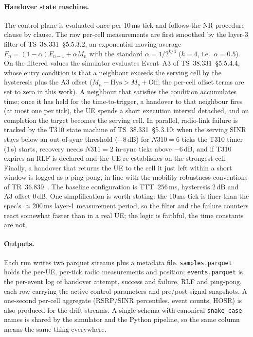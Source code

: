 \paragraph{Handover state machine.}
The control plane is evaluated once per 10\,ms tick and follows the NR procedure
clause by clause. The raw per-cell measurements are first smoothed by the
layer-3 filter of TS~38.331~\S5.5.3.2, an exponential moving average
$F_n = (1-\alpha)F_{n-1} + \alpha M_n$ with the standard
$\alpha = 1/2^{k/4}$ ($k=4$, i.e.\ $\alpha = 0.5$). On the filtered values the
simulator evaluates Event~A3 of TS~38.331~\S5.5.4.4, whose entry condition is
that a neighbour exceeds the serving cell by the hysteresis plus the A3 offset
($M_n - \mathrm{Hys} > M_s + \mathrm{Off}$; the per-cell offset terms are set to
zero in this work). A neighbour that satisfies the condition accumulates time;
once it has held for the time-to-trigger, a handover to that neighbour fires (at
most one per tick), the UE spends a short execution interval detached, and on
completion the target becomes the serving cell. In parallel, radio-link failure
is tracked by the T310 state machine of TS~38.331~\S5.3.10: when the serving SINR
stays below an out-of-sync threshold ($-8$\,dB) for $N310=6$ ticks the T310 timer
(1\,s) starts, recovery needs $N311=2$ in-sync ticks above $-6$\,dB, and if T310
expires an RLF is declared and the UE re-establishes on the strongest cell.
Finally, a handover that returns the UE to the cell it just left within a short
window is logged as a ping-pong, in line with the mobility-robustness conventions
of TR~36.839~\cite{ts38331,tr36839}. The baseline configuration is TTT~256\,ms,
hysteresis 2\,dB and A3 offset 0\,dB. One simplification is worth stating: the
10\,ms tick is finer than the spec's $\approx$200\,ms layer-1 measurement period,
so the filter and the failure counters react somewhat faster than in a real UE;
the logic is faithful, the time constants are not.

\paragraph{Outputs.}
Each run writes two parquet streams plus a metadata file. \texttt{samples.parquet}
holds the per-UE, per-tick radio measurements and position;
\texttt{events.parquet} is the per-event log of handover attempt, success and
failure, RLF and ping-pong, each row carrying the active control parameters and
pre/post signal snapshots. A one-second per-cell aggregate (RSRP/SINR
percentiles, event counts, HOSR) is also produced for the drift streams. A single
schema with canonical \texttt{snake\_case} names is shared by the simulator and
the Python pipeline, so the same column means the same thing everywhere.

